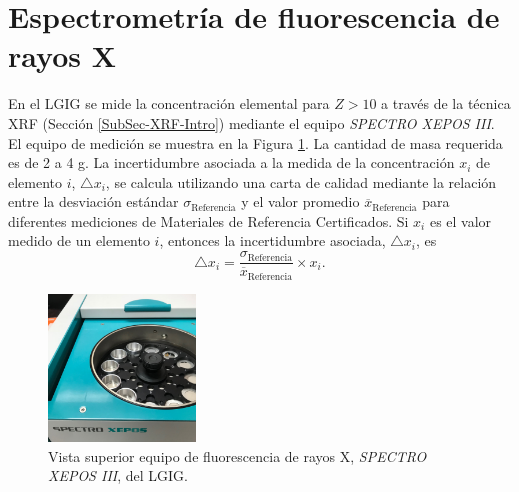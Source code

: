 	\section{Espectrometría de fluorescencia de rayos X}\label{Secc-EspectrometriaXRF}
En el LGIG se mide la concentración elemental para $Z>10$ a través de la técnica XRF (Sección \ref{SubSec-XRF-Intro}) mediante el equipo \textit{SPECTRO XEPOS III}. El equipo de medición se muestra en la Figura \ref{Fig-XEPOS}. La cantidad de masa requerida es de 2 a 4 g. La incertidumbre asociada a la medida de la concentración $x_i$ de elemento $i$, $\bigtriangleup x_i$, se calcula utilizando una carta de calidad mediante la relación entre la desviación estándar $\sigma_\text{Referencia}$ y el valor promedio $\overline{x}_\text{Referencia}$ para diferentes mediciones de Materiales de Referencia Certificados. Si $x_i$ es el valor medido de un elemento $i$, entonces la incertidumbre asociada, $\bigtriangleup x_i$, es
\begin{equation}\label{Eq-SigmaRef}
\bigtriangleup x_i = \dfrac{\sigma_\text{Referencia}}{\overline{x}_\text{Referencia}}\times x_i.
\end{equation}
\begin{figure}[h]
\centering
\includegraphics[width=0.35\textwidth]{Imagenes/XEPOS.jpg}
\caption{Vista superior equipo de fluorescencia de rayos X, \textit{SPECTRO XEPOS III}, del LGIG.}\label{Fig-XEPOS}
\end{figure}
